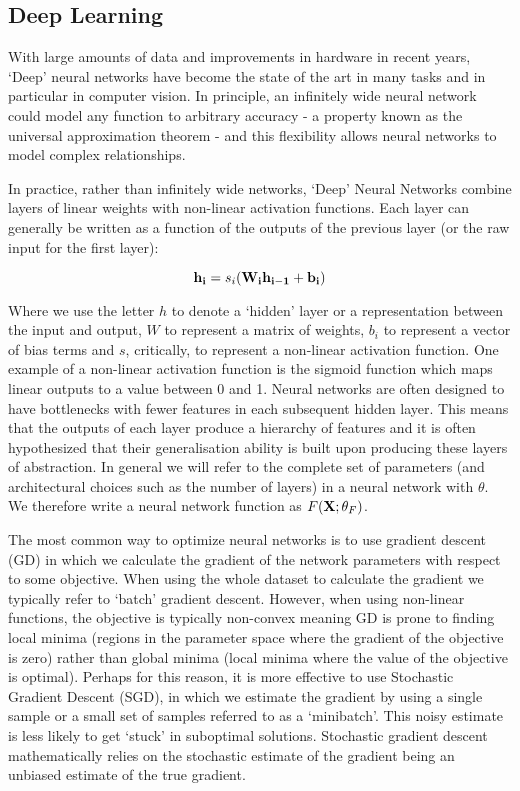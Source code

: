 \subsection{Deep Learning}

With large amounts of data and improvements in hardware in recent years, `Deep' neural networks have become the state of the art in many tasks and in particular in computer vision. In principle, an infinitely wide neural network could model any function to arbitrary accuracy - a property known as the universal approximation theorem - and this flexibility allows neural networks to model complex relationships.

In practice, rather than infinitely wide networks, `Deep' Neural Networks combine layers of linear weights with non-linear activation functions. Each layer can generally be written as a function of the outputs of the previous layer (or the raw input for the first layer):

$$
\bold{h_i}=s_i(\bold{W_ih_{i-1}}+\bold{b_i})
$$

Where we use the letter $h$ to denote a `hidden' layer or a representation between the input and output, $W$ to represent a matrix of weights, $b_i$ to represent a vector of bias terms and $s$, critically, to represent a non-linear activation function. One example of a non-linear activation function is the sigmoid function which maps linear outputs to a value between 0 and 1. Neural networks are often designed to have bottlenecks with fewer features in each subsequent hidden layer. This means that the outputs of each layer produce a hierarchy of features and it is often hypothesized that their generalisation ability is built upon producing these layers of abstraction\cite{li2018survey}. In general we will refer to the complete set of parameters (and architectural choices such as the number of layers) in a neural network with $\theta$. We therefore write a neural network function as $F(\bold{X};\theta_F)$.

The most common way to optimize neural networks is to use gradient descent (GD) in which we calculate the gradient of the network parameters with respect to some objective. When using the whole dataset to calculate the gradient we typically refer to `batch' gradient descent. However, when using non-linear functions, the objective is typically non-convex meaning GD is prone to finding local minima (regions in the parameter space where the gradient of the objective is zero) rather than global minima (local minima where the value of the objective is optimal). Perhaps for this reason, it is more effective to use Stochastic Gradient Descent (SGD), in which we estimate the gradient by using a single sample or a small set of samples referred to as a `minibatch'. This noisy estimate is less likely to get `stuck' in suboptimal solutions. Stochastic gradient descent mathematically relies on the stochastic estimate of the gradient being an unbiased estimate of the true gradient.

